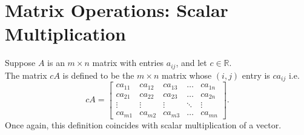 \documentclass{report}
\begin{document}
 \section{Matrix Operations: Scalar Multiplication}
 Suppose $ A$ is an $ m \times n$ matrix with entries $ a_{ i j}$, and let $  c \in \mathbb{R}$.\\
 The matrix $ cA$ is defined to be the $ m \times n$ matrix whose $ (i,j)$ entry is $ c a_{ i j}$ i.e.
 \[
  cA =  \begin{bmatrix}
      c a_{11} & c a_{12} & c a_{ 1 3} & \dots  & c a_{1n} \\
      c a_{21} & c a_{ 2 2} & c a_{ 2 3} & \dots  & c a_{2n} \\
      \vdots & \vdots & \vdots & \ddots & \vdots \\
      c a_{ m 1} & c a_{m 2} & c a_{ m 3} & \dots  & c a_{mn}\end{bmatrix}
 .\] 
 Once again, this definition coincides with scalar multiplication of a vector.\\
 \\
\end{document}
